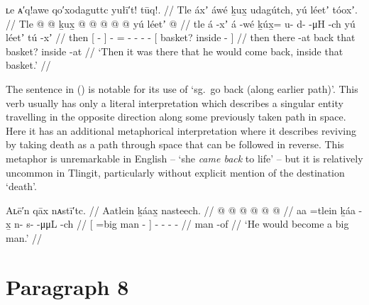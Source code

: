 \ex\label{ex:91-75-come-back-in-basket}%
%
\begingl
	\glpreamble	ʟe ᴀ′q!awe qo′xodaguttc yułī′t! tūq!. //
	\glpreamble	Tle áxʼ áwé ḵux̱ udagútch, yú léetʼ tóoxʼ. //
	\gla	Tle {}  @ {} {}  @ {}
		ḵux̱ @  @ {} @ {} @ {} @ {}
		{} yú léetʼ  @ {} {} //
	\glb	tle {} á -xʼ {} á -wé
		ḵúx̱= u- d-  -μH -ch
		{} yú léetʼ tú -xʼ {} //
	\glc	then {}[  - {}]  -
		= - -  - -
		{}[  basket? inside - {}] //
	\gld	then {} there -at {}  {}
		back\•  {} {} {} {}
		{} that basket? inside -at {}  //
	\glft	‘Then it was there that he would come back, inside that basket.’
		//
\endgl
\xe

The sentence in (\lastx) is notable for its use of  ‘sg.\ go back (along earlier path)’.
This verb usually has only a literal interpretation which describes a singular entity travelling in the opposite direction along some previously taken path in space.
Here it has an additional metaphorical interpretation where it describes reviving by taking death as a path through space that can be followed in reverse.
This metaphor is unremarkable in English – ‘she \emph{came back} to life’ – but it is relatively uncommon in Tlingit, particularly without explicit mention of the destination  ‘death’.

\ex\label{ex:91-76-become-big-man}%
%
\begingl
	\glpreamble	Aʟē′n qāx nᴀstī′tc. //
	\glpreamble	Aatlein ḵáax̱ nasteech. //
	\gla	{}  @ {}  @ {} {}  @ {} @ {} @ {} @ {} //
	\glb	{} aa =tlein ḵáa -x̱ {} n- s-  -μμL -ch //
	\glc	{}[  =big man - {}] - -  - - //
	\gld	{}  {} man -of {}  {} {} {} {} //
	\glft	‘He would become a big man.’
		//
\endgl
\xe

\section{Paragraph 8}\label{sec:91-para-8}

